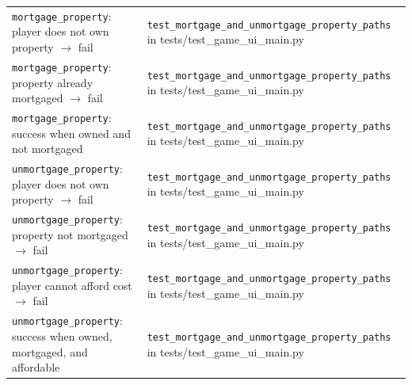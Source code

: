 \documentclass[11pt]{article}
\begin{document}
\begin{longtable}{>{\raggedright\arraybackslash}p{} >{\raggedright\arraybackslash}p{}}
\multicolumn{2}{l}{\textbf{moneypoly.game: mortgage\_property / unmortgage\_property}} \\ \hline
\texttt{mortgage\_property}: player does not own property $\rightarrow$ fail & \texttt{test\_mortgage\_and\_unmortgage\_property\_paths} in tests/test\_game\_ui\_main.py \\ \hline
\texttt{mortgage\_property}: property already mortgaged $\rightarrow$ fail & \texttt{test\_mortgage\_and\_unmortgage\_property\_paths} in tests/test\_game\_ui\_main.py \\ \hline
\texttt{mortgage\_property}: success when owned and not mortgaged & \texttt{test\_mortgage\_and\_unmortgage\_property\_paths} in tests/test\_game\_ui\_main.py \\ \hline
\texttt{unmortgage\_property}: player does not own property $\rightarrow$ fail & \texttt{test\_mortgage\_and\_unmortgage\_property\_paths} in tests/test\_game\_ui\_main.py \\ \hline
\texttt{unmortgage\_property}: property not mortgaged $\rightarrow$ fail & \texttt{test\_mortgage\_and\_unmortgage\_property\_paths} in tests/test\_game\_ui\_main.py \\ \hline
\texttt{unmortgage\_property}: player cannot afford cost $\rightarrow$ fail & \texttt{test\_mortgage\_and\_unmortgage\_property\_paths} in tests/test\_game\_ui\_main.py \\ \hline
\texttt{unmortgage\_property}: success when owned, mortgaged, and affordable & \texttt{test\_mortgage\_and\_unmortgage\_property\_paths} in tests/test\_game\_ui\_main.py \\ \hline


\end{longtable}
\end{document}
